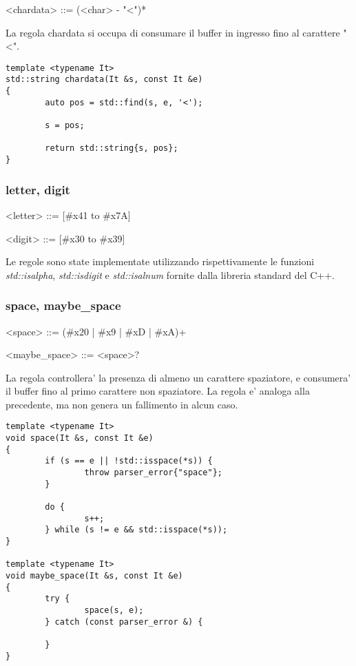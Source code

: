 \documentclass[italian,a4paper]{article}
\begin{document}
\begin{grammar}
	<chardata> ::= (<char> - "<")*
\end{grammar}

La regola chardata si occupa di consumare il buffer in ingresso fino al
carattere "<".

\begin{verbatim}
template <typename It> 
std::string chardata(It &s, const It &e) 
{
        auto pos = std::find(s, e, '<');

        s = pos;

        return std::string{s, pos};
}
\end{verbatim}

\subsubsection{letter, digit}

\begin{grammar}
	<letter> ::= [\#x41 to \#x7A]
\end{grammar}

\begin{grammar}
	<digit> ::= [\#x30 to \#x39]
\end{grammar}

Le regole sono state implementate utilizzando rispettivamente le funzioni
\emph{std::isalpha}, \emph{std::isdigit} e \emph{std::isalnum} fornite dalla
libreria standard del C++.

\subsubsection{space, maybe\_space}

\begin{grammar}
	<space> ::= (\#x20 | \#x9 | \#xD | \#xA)+

	<maybe\_space> ::= <space>?
\end{grammar}

La regola  controllera' la presenza di almeno un carattere
spaziatore, e consumera' il buffer fino al primo carattere non spaziatore. La
regola  e' analoga alla precedente, ma non genera un
fallimento in alcun caso.

\begin{verbatim}
template <typename It>
void space(It &s, const It &e)
{
        if (s == e || !std::isspace(*s)) {
                throw parser_error{"space"};
        }

        do {
                s++;
        } while (s != e && std::isspace(*s));
}

template <typename It>
void maybe_space(It &s, const It &e)
{
        try {
                space(s, e);
        } catch (const parser_error &) {

        }
}
\end{verbatim}
\end{document}
